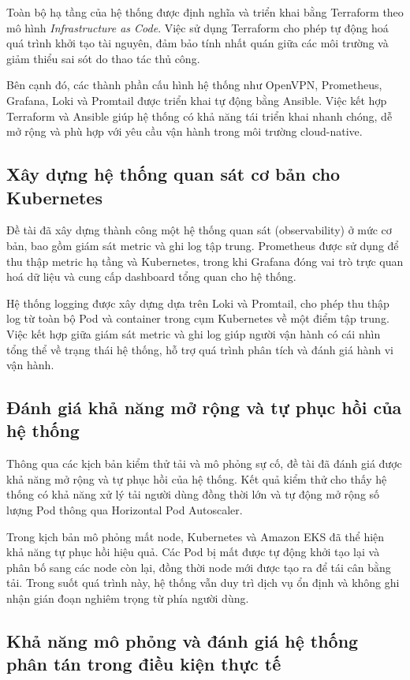 Toàn bộ hạ tầng của hệ thống được định nghĩa và triển khai bằng Terraform theo mô
hình \textit{Infrastructure as Code}. Việc sử dụng Terraform cho phép tự động hoá
quá trình khởi tạo tài nguyên, đảm bảo tính nhất quán giữa các môi trường và giảm
thiểu sai sót do thao tác thủ công.

Bên cạnh đó, các thành phần cấu hình hệ thống như OpenVPN, Prometheus, Grafana,
Loki và Promtail được triển khai tự động bằng Ansible. Việc kết hợp Terraform và
Ansible giúp hệ thống có khả năng tái triển khai nhanh chóng, dễ mở rộng và phù
hợp với yêu cầu vận hành trong môi trường cloud-native.

\subsection{Xây dựng hệ thống quan sát cơ bản cho Kubernetes}

Đề tài đã xây dựng thành công một hệ thống quan sát (observability) ở mức cơ bản,
bao gồm giám sát metric và ghi log tập trung. Prometheus được sử dụng để thu thập
metric hạ tầng và Kubernetes, trong khi Grafana đóng vai trò trực quan hoá dữ liệu
và cung cấp dashboard tổng quan cho hệ thống.

Hệ thống logging được xây dựng dựa trên Loki và Promtail, cho phép thu thập log từ
toàn bộ Pod và container trong cụm Kubernetes về một điểm tập trung. Việc kết hợp
giữa giám sát metric và ghi log giúp người vận hành có cái nhìn tổng thể về trạng
thái hệ thống, hỗ trợ quá trình phân tích và đánh giá hành vi vận hành.

\subsection{Đánh giá khả năng mở rộng và tự phục hồi của hệ thống}

Thông qua các kịch bản kiểm thử tải và mô phỏng sự cố, đề tài đã đánh giá được khả
năng mở rộng và tự phục hồi của hệ thống. Kết quả kiểm thử cho thấy hệ thống có khả
năng xử lý tải người dùng đồng thời lớn và tự động mở rộng số lượng Pod thông qua
Horizontal Pod Autoscaler.

Trong kịch bản mô phỏng mất node, Kubernetes và Amazon EKS đã thể hiện khả năng tự
phục hồi hiệu quả. Các Pod bị mất được tự động khởi tạo lại và phân bố sang các node
còn lại, đồng thời node mới được tạo ra để tái cân bằng tải. Trong suốt quá trình
này, hệ thống vẫn duy trì dịch vụ ổn định và không ghi nhận gián đoạn nghiêm trọng
từ phía người dùng.

\subsection{Khả năng mô phỏng và đánh giá hệ thống phân tán trong điều kiện thực tế}

